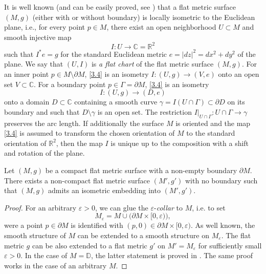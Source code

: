\documentclass[12pt,reqno]{amsart}
\newcommand{\R}{\mathbb{R}}
\newcommand{\D}{\mathbb{D}}
\begin{document}
It is well known (and can be easily proved, see \cite[Lemma 2.4]{Sr2}) that a flat metric surface $(M,g)$ (either with or without boundary) is locally isometric to the Euclidean plane, i.e., for every point $p\in M$, there exist an open neighborhood $U\subset M$ and smooth injective map
\begin{equation}
I:U\to{\mathbb C}={\R}^2
                                \label{3.4}
\end{equation}
such that $I^*e=g$ for the standard Euclidean metric $e=|dz|^2=dx^2+dy^2$ of the plane.
We say that $(U,I)$ is {\it a flat chart} of the flat metric surface $(M,g)$.
For an inner point $p\in M\setminus\partial M$, \eqref{3.4} is an isometry
$
I:(U,g)\to(V,e)
$
onto an open set $V\subset{\mathbb C}$. For a boundary point $p\in\Gamma=\partial M$, \eqref{3.4} is an isometry
\begin{equation}
I:(U,g)\to(D,e)
                                \label{3.5}
\end{equation}
onto a domain $D\subset{\mathbb C}$ containing a smooth curve $\gamma=I(U\cap\Gamma)\subset\partial D$ on its boundary and such that $D\setminus\gamma$ is an open set. The restriction $I|_{U\cap\Gamma}:U\cap\Gamma\to\gamma$ preserves the arc length.
If additionally the surface $M$ is oriented and the map \eqref{3.4} is assumed to transform the chosen orientation of $M$ to the standard orientation of ${\R}^2$, then the map $I$ is unique up to the composition with a shift and rotation of the plane.

\begin{proposition} \label{P3.2}
Let $(M,g)$ be a compact flat metric surface with a non-empty boundary $\partial M$. There exists a non-compact flat metric surface $(M',g')$ with no boundary such that $(M,g)$ admits an isometric embedding into $(M',g')$.
\end{proposition}

\begin{proof}
For an arbitrary $\varepsilon>0$, we can glue the $\varepsilon$-{\it collar} to $M$, i.e. to set
$$
M_\varepsilon=M\cup\big(\partial M\times[0,\varepsilon)\big),
$$
were a point $p\in\partial M$ is identified with $(p,0)\in\partial M\times[0,\varepsilon)$. As well known, the smooth structure of $M$ can be extended to a smooth structure on $M_\varepsilon$. The flat metric $g$ can be also extended to a flat metric $g'$ on $M'=M_\varepsilon$ for sufficiently small $\varepsilon>0$. In the case of $M=\D$, the latter statement is proved in \cite[Lemma 2.3]{Sr2}. The same proof works in the case of an arbitrary $M$.
\end{proof}
\end{document}
